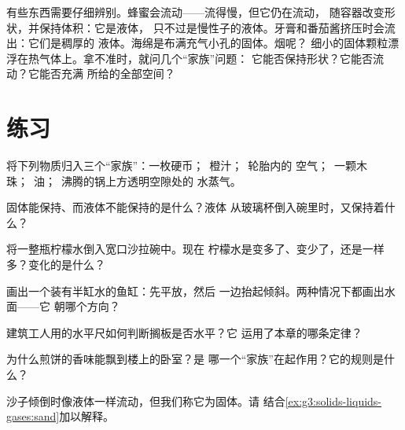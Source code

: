 \begin{remark}[分辨难辨的情形]\label{rem:g3:solids-liquids-gases:tricky}
有些东西需要仔细辨别。蜂蜜会流动——流得慢，但它仍在流动，
随容器改变形状，并保持体积：它是液体，
只不过是慢性子的液体。牙膏和番茄酱挤压时会流出：它们是稠厚的
液体。海绵是布满充气小孔的固体。烟呢？
细小的固体颗粒漂浮在热气体上。拿不准时，就问几个“家族”问题：
它能否保持形状？它能否流动？它能否充满
所给的全部空间？
\end{remark}

\section{练习}

\begin{exercise}[$\star$]\label{exo:g3:solids-liquids-gases:1}
将下列物质归入三个“家族”：一枚硬币；\ 橙汁；\ 轮胎内的
空气；\ 一颗木珠；\ 油；\ 沸腾的锅上方透明空隙处的
水蒸气。
\end{exercise}

\begin{exercise}[$\star$]\label{exo:g3:solids-liquids-gases:2}
固体能保持、而液体不能保持的是什么？液体
从玻璃杯倒入碗里时，又保持着什么？
\end{exercise}

\begin{exercise}[$\star$]\label{exo:g3:solids-liquids-gases:3}
将一整瓶柠檬水倒入宽口沙拉碗中。现在
柠檬水是变多了、变少了，还是一样多？变化的是什么？
\end{exercise}

\begin{exercise}[$\star$]\label{exo:g3:solids-liquids-gases:4}
画出一个装有半缸水的鱼缸：先平放，然后
一边抬起倾斜。两种情况下都画出水面——它
朝哪个方向？
\end{exercise}

\begin{exercise}[$\star$]\label{exo:g3:solids-liquids-gases:5}
建筑工人用的水平尺如何判断搁板是否水平？它
运用了本章的哪条定律？
\end{exercise}

\begin{exercise}[$\star$]\label{exo:g3:solids-liquids-gases:6}
为什么煎饼的香味能飘到楼上的卧室？是
哪一个“家族”在起作用？它的规则是什么？
\end{exercise}

\begin{exercise}[$\star$]\label{exo:g3:solids-liquids-gases:7}
沙子倾倒时像液体一样流动，但我们称它为固体。请
结合\cref{ex:g3:solids-liquids-gases:sand}加以解释。
\end{exercise}

